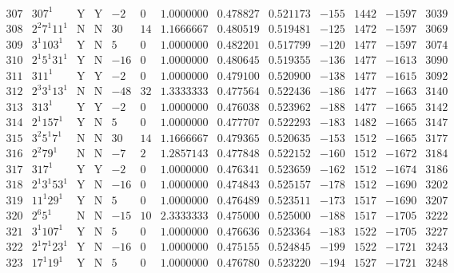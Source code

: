 \documentclass[11pt,reqno,a4letter]{article}
\numberwithin{equation}{section}
\numberwithin{figure}{section}
\numberwithin{table}{section}
\theoremstyle{plain}
\numberwithin{theorem}{section}
\theoremstyle{definition}
\begin{document}
\begin{table}[ht]
\begin{equation*}
{\begin{array}{cc|cc|ccc|cc|cccc}
 307 & 307^1 & \text{Y} & \text{Y} & -2 & 0 & 1.0000000 & 0.478827 & 0.521173 & -155 & 1442 & -1597 & 3039 \\
 308 & 2^2 7^1 11^1 & \text{N} & \text{N} & 30 & 14 & 1.1666667 & 0.480519 & 0.519481 & -125 & 1472 & -1597 & 3069 \\
 309 & 3^1 103^1 & \text{Y} & \text{N} & 5 & 0 & 1.0000000 & 0.482201 & 0.517799 & -120 & 1477 & -1597 & 3074 \\
 310 & 2^1 5^1 31^1 & \text{Y} & \text{N} & -16 & 0 & 1.0000000 & 0.480645 & 0.519355 & -136 & 1477 & -1613 & 3090 \\
 311 & 311^1 & \text{Y} & \text{Y} & -2 & 0 & 1.0000000 & 0.479100 & 0.520900 & -138 & 1477 & -1615 & 3092 \\
 312 & 2^3 3^1 13^1 & \text{N} & \text{N} & -48 & 32 & 1.3333333 & 0.477564 & 0.522436 & -186 & 1477 & -1663 & 3140 \\
 313 & 313^1 & \text{Y} & \text{Y} & -2 & 0 & 1.0000000 & 0.476038 & 0.523962 & -188 & 1477 & -1665 & 3142 \\
 314 & 2^1 157^1 & \text{Y} & \text{N} & 5 & 0 & 1.0000000 & 0.477707 & 0.522293 & -183 & 1482 & -1665 & 3147 \\
 315 & 3^2 5^1 7^1 & \text{N} & \text{N} & 30 & 14 & 1.1666667 & 0.479365 & 0.520635 & -153 & 1512 & -1665 & 3177 \\
 316 & 2^2 79^1 & \text{N} & \text{N} & -7 & 2 & 1.2857143 & 0.477848 & 0.522152 & -160 & 1512 & -1672 & 3184 \\
 317 & 317^1 & \text{Y} & \text{Y} & -2 & 0 & 1.0000000 & 0.476341 & 0.523659 & -162 & 1512 & -1674 & 3186 \\
 318 & 2^1 3^1 53^1 & \text{Y} & \text{N} & -16 & 0 & 1.0000000 & 0.474843 & 0.525157 & -178 & 1512 & -1690 & 3202 \\
 319 & 11^1 29^1 & \text{Y} & \text{N} & 5 & 0 & 1.0000000 & 0.476489 & 0.523511 & -173 & 1517 & -1690 & 3207 \\
 320 & 2^6 5^1 & \text{N} & \text{N} & -15 & 10 & 2.3333333 & 0.475000 & 0.525000 & -188 & 1517 & -1705 & 3222 \\
 321 & 3^1 107^1 & \text{Y} & \text{N} & 5 & 0 & 1.0000000 & 0.476636 & 0.523364 & -183 & 1522 & -1705 & 3227 \\
 322 & 2^1 7^1 23^1 & \text{Y} & \text{N} & -16 & 0 & 1.0000000 & 0.475155 & 0.524845 & -199 & 1522 & -1721 & 3243 \\
 323 & 17^1 19^1 & \text{Y} & \text{N} & 5 & 0 & 1.0000000 & 0.476780 & 0.523220 & -194 & 1527 & -1721 & 3248 \\

\end{array}}
\end{equation*}
\end{table}
\end{document}

